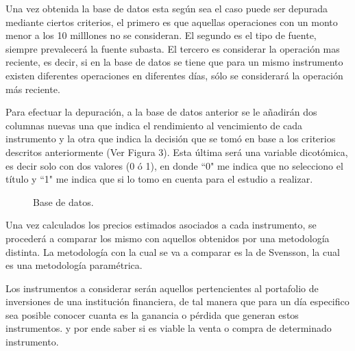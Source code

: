 \hspace{0.4cm} Una vez obtenida la base de datos esta seg\'un sea el caso puede ser depurada mediante ciertos criterios, el primero es que aquellas operaciones con un monto menor a los 10 milllones no se consideran. El segundo es el tipo de fuente, siempre prevalecer\'a la fuente subasta. El tercero es considerar la operaci\'on mas reciente, es decir, si en la base de datos se tiene que para un mismo instrumento existen diferentes operaciones en diferentes d\'ias, s\'olo se considerar\'a la operaci\'on m\'as reciente.

\vspace{0.5cm}

\hspace{0.4cm} Para efectuar la depuraci\'on, a la base de datos anterior se le a\~nadir\'an dos columnas nuevas una que indica el rendimiento al vencimiento de cada instrumento y la otra que indica la decisi\'on que se tom\'o en base a los criterios descritos anteriormente (Ver Figura 3). Esta \'ultima ser\'a una variable dicot\'omica, es decir solo con dos valores (0 \'o 1), en donde ``0" me indica que no selecciono el t\'itulo y ``1" me indica que si lo tomo en cuenta para el estudio a realizar.

\begin{figure}[h]
\caption{Base de datos.}
\label{base_datos}
\end{figure}


\hspace{0.4cm} Una vez calculados los precios estimados asociados a cada instrumento, se proceder\'a a comparar los mismo con aquellos obtenidos por una metodolog\'ia distinta. La metodolog\'ia con la cual se va a comparar es la de Svensson, la cual es una metodolog\'ia param\'etrica.



\hspace{0.4cm} Los instrumentos a considerar ser\'an aquellos pertencientes al portafolio de inversiones de una instituci\'on financiera, de tal manera que para un d\'ia especifico sea posible conocer cuanta es la ganancia o p\'erdida que generan estos instrumentos. y por ende saber si es viable la venta o compra de determinado instrumento.


